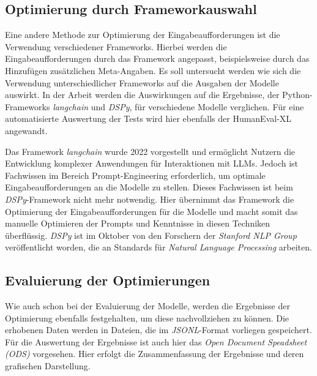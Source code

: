 \subsection{Optimierung durch Frameworkauswahl}
Eine andere Methode zur Optimierung der Eingabeaufforderungen ist die Verwendung verschiedener Frameworks. Hierbei werden die Eingabeaufforderungen durch das Framework angepasst, beispielsweise durch das Hinzufügen zusätzlichen Meta-Angaben. Es soll untersucht werden wie sich die Verwendung unterschiedlicher Frameworks auf die Ausgaben der Modelle auswirkt. In der Arbeit werden die Auswirkungen auf die Ergebnisse, der Python-Frameworks \textit{langchain} und \textit{DSPy}, für verschiedene Modelle verglichen. Für eine automatisierte Auswertung der Tests wird hier ebenfalls der HumanEval-XL angewandt.\vspace{0.2cm}

Das Framework \textit{langchain} wurde 2022 vorgestellt und ermöglicht Nutzern die Entwicklung komplexer Anwendungen für Interaktionen mit LLMs. Jedoch ist Fachwissen im Bereich Prompt-Engineering erforderlich, um optimale Eingabeaufforderungen an die Modelle zu stellen. Dieses Fachwissen ist beim \textit{DSPy}-Framework nicht mehr notwendig. Hier übernimmt das Framework die Optimierung der Eingabeaufforderungen für die Modelle und macht somit das manuelle Optimieren der Prompts und Kenntnisse in diesen Techniken überflüssig. \textit{DSPy} ist im Oktober von den Forschern der \textit{Stanford NLP Group} veröffentlicht worden, die an Standards für \textit{Natural Language Processing} arbeiten.\vspace{0.2cm}


\subsection{Evaluierung der Optimierungen}
Wie auch schon bei der Evaluierung der Modelle, werden die Ergebnisse der Optimierung ebenfalls festgehalten, um diese nachvollziehen zu können. Die erhobenen Daten werden in Dateien, die im \textit{JSONL}-Format vorliegen gespeichert. Für die Auswertung der Ergebnisse ist auch hier das \textit{Open Document Speadsheet (ODS)} vorgesehen. Hier erfolgt die Zusammenfassung der Ergebnisse und deren grafischen Darstellung.\vspace{0.2cm}

